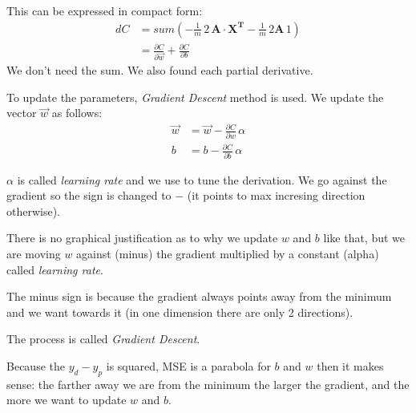 This can be expressed in compact form:
\begin{align}
  dC &= sum(-\frac{1}{m}\,{}2\,\mathbf{A}\cdot{}\mathbf{X^T} -\frac{1}{m}\,{}2\mathbf{A}\,{}1)\\
  &= \frac{\partial C}{\partial \vec{w}} + \frac{\partial C}{\partial b}  \nonumber
\end{align}
We don't need the sum. We also found each partial derivative.

To update the parameters, \textit{Gradient Descent} method is used. We update the vector $\vec{w}$ as follows:
\begin{align}
  \vec{w} &= \vec{w} -\frac{\partial C}{\partial w}\,{}\alpha\\
  b &= b -\frac{\partial C}{\partial b}\,{}\alpha
\end{align}

$\alpha$ is called \textit{learning rate} and we use to tune the derivation. We go against the gradient so the sign is changed to $-$ (it points to max incresing direction otherwise).

There is no graphical justification as to why we update $w$ and $b$ like that, but we are moving $w$ against (minus) the gradient multiplied by a constant (alpha) called \textit{learning rate}.

The minus sign is because the gradient always points away from the minimum and we want towards it (in one dimension there are only 2 directions). 

The process is called \textit{Gradient Descent}.

Because the $y_d - y_p$ is squared, MSE is a parabola for $b$ and $w$ then it makes sense: the farther away we are from the minimum the larger the gradient, and the more we want to update $w$ and $b$.



